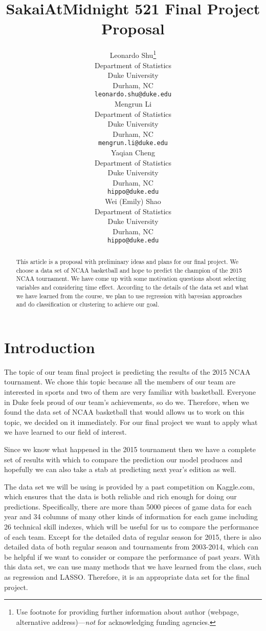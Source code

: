 \documentclass{article} %
\title{SakaiAtMidnight 521 Final Project Proposal}
\author{
Leonardo Shu\thanks{ Use footnote for providing further information
about author (webpage, alternative address)---\emph{not} for acknowledging
funding agencies.} \\
Department of Statistics\\
Duke University\\
Durham, NC \\
\texttt{leonardo.shu@duke.edu} \\
\And
Mengrun Li \\
Department of Statistics\\
Duke University\\
Durham, NC \\
\texttt{mengrun.li@duke.edu} \\
\AND
Yaqian Cheng \\
Department of Statistics\\
Duke University\\
Durham, NC \\
\texttt{hippo@duke.edu} \\
\And
Wei (Emily) Shao \\
Department of Statistics\\
Duke University\\
Durham, NC \\
\texttt{hippo@duke.edu} \\
}
\begin{document}
\maketitle

\begin{abstract}
This article is a proposal with preliminary ideas and plans for our final project. We choose a data set of NCAA basketball and hope to predict the champion of the 2015 NCAA tournament. We have come up with some motivation questions about selecting variables and considering time effect. According to the details of the data set and what we have learned from the course, we plan to use regression with bayesian approaches and do classification or clustering to achieve our goal.
\end{abstract}

\section{Introduction}

The topic of our team final project is predicting the results of the 2015 NCAA tournament. We chose this topic because all the members of our team are interested in sports and two of them are very familiar with basketball. Everyone in Duke feels proud of our team's achievements, so do we. Therefore, when we found the data set of NCAA basketball that would allows us to work on this topic, we decided on it immediately. For our final project we want to apply what we have learned to our field of interest.

Since we know what happened in the 2015 tournament then we have a complete set of results with which to compare the prediction our model produces and hopefully we can also take a stab at predicting next year's edition as well.

The data set we will be using is provided by a past competition on Kaggle.com, which ensures that the data is both reliable and rich enough for doing our predictions. Specifically, there are more than 5000 pieces of game data for each year and 34 columns of many other kinds of information for each game including 26 technical skill indexes, which will be useful for us to compare the performance of each team. Except for the detailed data of regular season for 2015, there is also detailed data of both regular season and tournaments from 2003-2014, which can be helpful if we want to consider or compare the performance of past years. With this data set, we can use many methods that we have learned from the class, such as regression and LASSO. Therefore, it is an appropriate data set for the final project.
\end{document}
